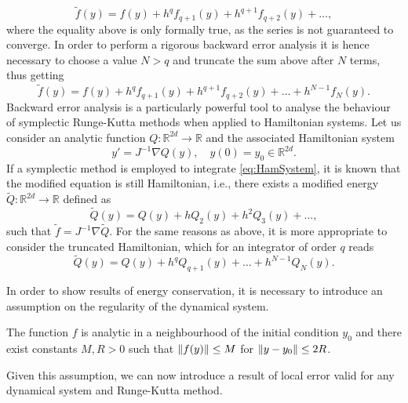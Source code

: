 \documentclass{siamart1116}
\numberwithin{theorem}{section}
\DeclarePairedDelimiter{\norm}{\|}{\|}
\newcommand{\R}{\mathbb{R}}
\begin{document}
\begin{equation}
	\tilde f(y) = f(y) + h^q f_{q+1}(y) + h^{q+1} f_{q+2}(y) + \ldots,
\end{equation}
where the equality above is only formally true, as the series is not guaranteed to converge. In order to perform a rigorous backward error analysis it is hence necessary to choose a value $N > q$ and truncate the sum above after $N$ terms, thus getting 
\begin{equation}
	\tilde f(y) = f(y) + h^q f_{q+1}(y) + h^{q+1} f_{q+2}(y) + \ldots + h^{N-1}f_N(y).
\end{equation}
Backward error analysis is a particularly powerful tool to analyse the behaviour of symplectic Runge-Kutta methods when applied to Hamiltonian systems. Let us consider an analytic function $Q \colon \R^{2d} \to \R$ and the associated Hamiltonian system
\begin{equation}\label{eq:HamSystem}
y' = J^{-1}\nabla Q(y), \quad y(0) = y_0 \in \R^{2d}.
\end{equation}
If a symplectic method is employed to integrate \eqref{eq:HamSystem}, it is known that the modified equation is still Hamiltonian, i.e., there exists a modified energy $\tilde Q \colon \R^{2d} \to \R$ defined as
\begin{equation}\label{eq:ModifiedHamiltonian}
\tilde Q(y) = Q(y) + h Q_2(y) + h^2 Q_3(y) + \ldots,
\end{equation}
such that $\tilde f = J^{-1}\nabla \tilde Q$. For the same reasons as above, it is more appropriate to consider the truncated Hamiltonian, which for an integrator of order $q$ reads
\begin{equation}\label{eq:ModifiedHamiltonianTrunc}
	\tilde Q(y) = Q(y) + h^q Q_{q+1}(y) + \ldots + h^{N-1} Q_N(y).
\end{equation}

In order to show results of energy conservation, it is necessary to introduce an assumption on the regularity of the dynamical system.

\begin{assumption}\label{as:RegHamiltonian} The function $f$ is analytic in a neighbourhood of the initial condition $y_0$ and there exist constants $M, R > 0$ such that $\norm{f(y)} \leq M$ for $\norm{y - y_0} \leq 2R$.
\end{assumption}

Given this assumption, we can now introduce a result of local error valid for any dynamical system and Runge-Kutta method.
\end{document}
